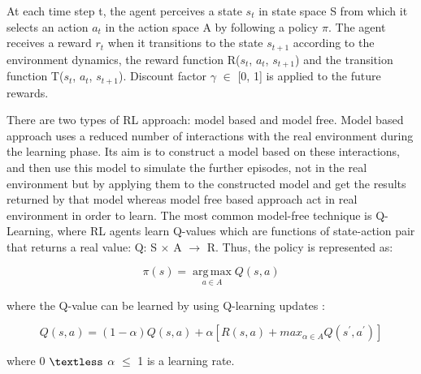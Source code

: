 \documentclass[12pt]{report}
\begin{document}
At each time step t, the agent perceives a state $s_t$ in state space S from which it selects an action $a_t$ in the action space A by following a policy $\pi$. The agent receives a reward $r_t$ when it transitions to the state $s_{t+1}$ according to the environment dynamics, the reward function R($s_t$, $a_t$, $s_{t+1}$) and the transition function T($s_t$, $a_t$, $s_{t+1}$). Discount factor $\gamma$ $\in$ [0, 1] is applied to the future rewards. 

There are two types of RL approach: model based and model free. Model based approach uses a reduced number of interactions with the real environment during the learning phase. Its aim is to construct a model based on these interactions, and then use this model to simulate the further episodes, not in the real environment but by applying them to the constructed model and get the results returned by that model whereas model free based approach act in real environment in order to learn. The most common model-free technique is Q-Learning, where RL agents learn Q-values which are functions of state-action
pair that returns a real value: Q: S $\times$ A $\rightarrow$ R. Thus, the policy is represented as: 

\[ \pi(s) =  \operatorname*{arg\,max}_{a \in A} Q(s,a) \]
 
 where the Q-value can be learned by using Q-learning updates \cite{Q-Learning}:
 
\[ Q(s,a) = (1- \alpha ) Q(s,a) + \alpha[R(s,a) +   {max}_{\alpha \in A} Q(s^{'} , a^{'})] \]

where 0 $\textless$ $\alpha$ $\leq$ 1 is a learning rate. 
\end{document}
